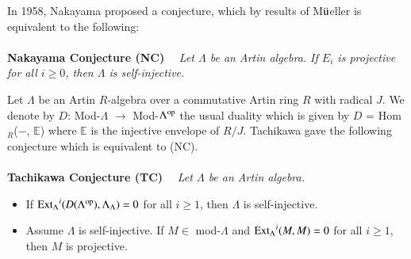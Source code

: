 \documentclass[11pt,a4paper]{article}
\begin{document}
In 1958,   Nakayama \cite{nak}   proposed a conjecture, which by results
of M$\ddot{\rm u}$eller \cite{mue}   is equivalent to the following:
\\
\\
{\bf Nakayama Conjecture (NC) }\ \ {\it  Let   $\Lambda$  be    an Artin algebra. If    $E_i$ is projective for all $i \geq 0$, then  $\Lambda$ is self-injective.}
\\
\par
 Let $\Lambda$  be    an Artin $R$-algebra over a commutative  Artin ring $R$ with radical $J$. We denote by $D$: Mod-$\Lambda$  $\rightarrow$ Mod-$\Lambda^{{\rm op}}$
 the usual duality which is given by  $D$ = Hom$_{R}$($-$, $\mathbb{E}$) where $\mathbb{E}$ is the injective envelope of $R/J$.
 Tachikawa \cite{tac} gave the following conjecture which is equivalent to (NC).
 \\
\\
{\bf Tachikawa Conjecture (TC) }\ \ {\it  Let   $\Lambda$  be    an Artin algebra. }
\begin{itemize}
\item[$({\rm T1})$]If ${\rm Ext_{\Lambda}}^{i}(D(\Lambda^{{\rm op}}),  \Lambda_{\Lambda})=0$ for all  $i \geq 1$, then $\Lambda$ is self-injective.
\item[$({\rm T2})$] Assume  $\Lambda$ is self-injective. If $M \in$  mod-$\Lambda$   and  ${\rm Ext_{\Lambda}}^{i}(M, M )=0$ for all  $i \geq 1$, then $M$ is projective.\end{itemize}
\end{document}
